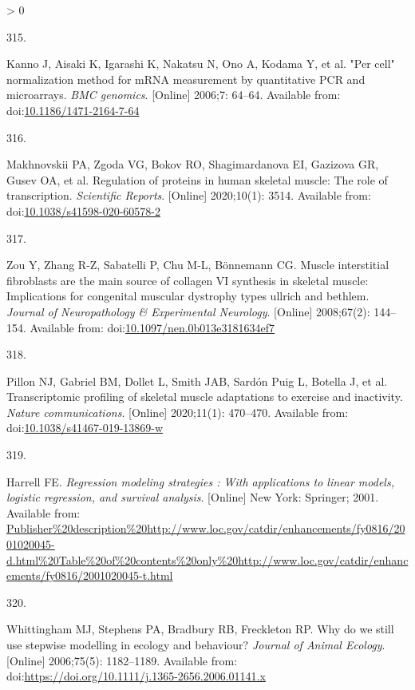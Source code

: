 \documentclass[twoside,10pt]{gihclass} %
\newlength{\cslhangindent}
\newlength{\csllabelwidth}
\newenvironment{CSLReferences}[3] %
 {%
  \setlength{\parindent}{0pt}
  \ifodd #1 \everypar{\setlength{\hangindent}{\cslhangindent}}\ignorespaces\fi
  \ifnum #2 > 0
  \setlength{\parskip}{#2\baselineskip}
  \fi
 }%
 {}
\newcommand{\CSLLeftMargin}[1]{\parbox[t]{\maxof{\widthof{#1}}{\csllabelwidth}}{#1}}
\newcommand{\CSLRightInline}[1]{\parbox[t]{\linewidth}{#1}}
\begin{document}
\begin{CSLReferences}{0}{0}
\leavevmode\hypertarget{ref-RN2182}{}%
\CSLLeftMargin{315. }
\CSLRightInline{Kanno J, Aisaki K, Igarashi K, Nakatsu N, Ono A, Kodama Y, et al. "Per cell" normalization method for mRNA measurement by quantitative PCR and microarrays. \emph{BMC genomics}. {[}Online{]} 2006;7: 64--64. Available from: doi:\href{https://doi.org/10.1186/1471-2164-7-64}{10.1186/1471-2164-7-64}}

\leavevmode\hypertarget{ref-RN2448}{}%
\CSLLeftMargin{316. }
\CSLRightInline{Makhnovskii PA, Zgoda VG, Bokov RO, Shagimardanova EI, Gazizova GR, Gusev OA, et al. Regulation of proteins in human skeletal muscle: The role of transcription. \emph{Scientific Reports}. {[}Online{]} 2020;10(1): 3514. Available from: doi:\href{https://doi.org/10.1038/s41598-020-60578-2}{10.1038/s41598-020-60578-2}}

\leavevmode\hypertarget{ref-RN2883}{}%
\CSLLeftMargin{317. }
\CSLRightInline{Zou Y, Zhang R-Z, Sabatelli P, Chu M-L, Bönnemann CG. Muscle interstitial fibroblasts are the main source of collagen VI synthesis in skeletal muscle: Implications for congenital muscular dystrophy types ullrich and bethlem. \emph{Journal of Neuropathology \& Experimental Neurology}. {[}Online{]} 2008;67(2): 144--154. Available from: doi:\href{https://doi.org/10.1097/nen.0b013e3181634ef7}{10.1097/nen.0b013e3181634ef7}}

\leavevmode\hypertarget{ref-RN2360}{}%
\CSLLeftMargin{318. }
\CSLRightInline{Pillon NJ, Gabriel BM, Dollet L, Smith JAB, Sardón Puig L, Botella J, et al. Transcriptomic profiling of skeletal muscle adaptations to exercise and inactivity. \emph{Nature communications}. {[}Online{]} 2020;11(1): 470--470. Available from: doi:\href{https://doi.org/10.1038/s41467-019-13869-w}{10.1038/s41467-019-13869-w}}

\leavevmode\hypertarget{ref-RN2881}{}%
\CSLLeftMargin{319. }
\CSLRightInline{Harrell FE. \emph{Regression modeling strategies : With applications to linear models, logistic regression, and survival analysis}. {[}Online{]} New York: Springer; 2001. Available from: \url{Publisher\%20description\%20http://www.loc.gov/catdir/enhancements/fy0816/2001020045-d.html\%20Table\%20of\%20contents\%20only\%20http://www.loc.gov/catdir/enhancements/fy0816/2001020045-t.html}}

\leavevmode\hypertarget{ref-RN2882}{}%
\CSLLeftMargin{320. }
\CSLRightInline{Whittingham MJ, Stephens PA, Bradbury RB, Freckleton RP. Why do we still use stepwise modelling in ecology and behaviour? \emph{Journal of Animal Ecology}. {[}Online{]} 2006;75(5): 1182--1189. Available from: doi:\url{https://doi.org/10.1111/j.1365-2656.2006.01141.x}}


\end{CSLReferences}
\end{document}
